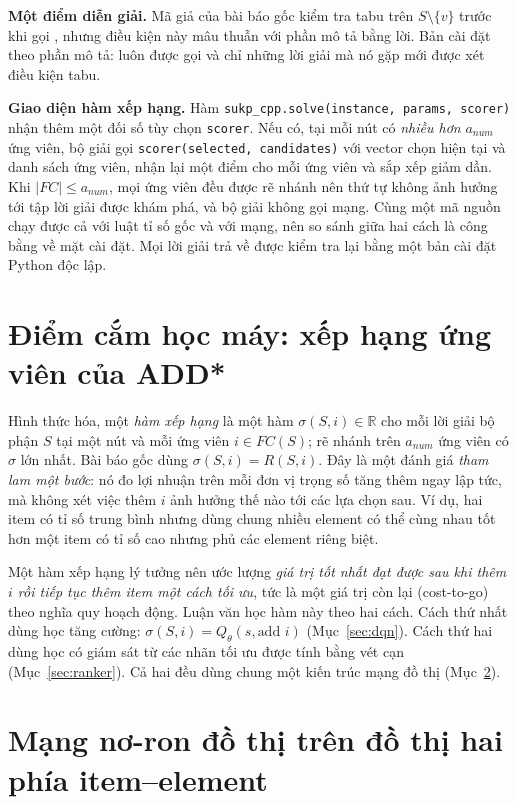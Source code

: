 \textbf{Một điểm diễn giải.} Mã giả của bài báo gốc kiểm tra tabu trên $S\setminus\{v\}$ trước khi gọi \addstar, nhưng điều kiện này mâu thuẫn với phần mô tả bằng lời. Bản cài đặt theo phần mô tả: \addstar luôn được gọi và chỉ những lời giải mà nó gặp mới được xét điều kiện tabu.

\textbf{Giao diện hàm xếp hạng.} Hàm \texttt{sukp\_cpp.solve(instance, params, scorer)} nhận thêm một đối số tùy chọn \texttt{scorer}. Nếu có, tại mỗi nút \addstar có \emph{nhiều hơn} $a_{num}$ ứng viên, bộ giải gọi \texttt{scorer(selected, candidates)} với vector chọn hiện tại và danh sách ứng viên, nhận lại một điểm cho mỗi ứng viên và sắp xếp giảm dần. Khi $|FC|\le a_{num}$, mọi ứng viên đều được rẽ nhánh nên thứ tự không ảnh hưởng tới tập lời giải được khám phá, và bộ giải không gọi mạng. Cùng một mã nguồn chạy được cả với luật tỉ số gốc và với mạng, nên so sánh giữa hai cách là công bằng về mặt cài đặt. Mọi lời giải trả về được kiểm tra lại bằng một bản cài đặt Python độc lập.

\section{Điểm cắm học máy: xếp hạng ứng viên của ADD*}\label{sec:plugin}

Hình thức hóa, một \emph{hàm xếp hạng} là một hàm $\sigma(S,i)\in\mathbb{R}$ cho mỗi lời giải bộ phận $S$ tại một nút \addstar và mỗi ứng viên $i\in FC(S)$; \addstar rẽ nhánh trên $a_{num}$ ứng viên có $\sigma$ lớn nhất. Bài báo gốc dùng $\sigma(S,i)=R(S,i)$. Đây là một đánh giá \emph{tham lam một bước}: nó đo lợi nhuận trên mỗi đơn vị trọng số tăng thêm ngay lập tức, mà không xét việc thêm $i$ ảnh hưởng thế nào tới các lựa chọn sau. Ví dụ, hai item có tỉ số trung bình nhưng dùng chung nhiều element có thể cùng nhau tốt hơn một item có tỉ số cao nhưng phủ các element riêng biệt.

Một hàm xếp hạng lý tưởng nên ước lượng \emph{giá trị tốt nhất đạt được sau khi thêm $i$ rồi tiếp tục thêm item một cách tối ưu}, tức là một giá trị còn lại (cost-to-go) theo nghĩa quy hoạch động. Luận văn học hàm này theo hai cách. Cách thứ nhất dùng học tăng cường: $\sigma(S,i)=Q_\theta(s,\text{add } i)$ (Mục~\ref{sec:dqn}). Cách thứ hai dùng học có giám sát từ các nhãn tối ưu được tính bằng vét cạn (Mục~\ref{sec:ranker}). Cả hai đều dùng chung một kiến trúc mạng đồ thị (Mục~\ref{sec:gnn_arch}).

\section{Mạng nơ-ron đồ thị trên đồ thị hai phía item--element}\label{sec:gnn_arch}

